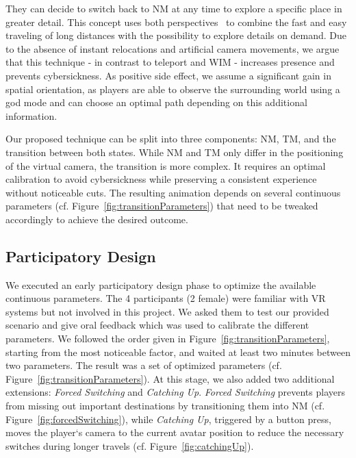 \documentclass[sigchi-a, authorversion]{acmart}
\newcommand{\comm}[1]{}
\begin{document}
They can decide to switch back to NM at any time to explore a specific place in greater detail. \comm{The resulting transition between NM and TM is a short transformation between both camera position.} This concept uses both perspectives~\cite{gorisse2017first} to combine the fast and easy traveling of long distances with the possibility to explore details on demand. Due to the absence of instant relocations and artificial camera movements, we argue that this technique - in contrast to teleport and WIM - increases presence and prevents cybersickness. As positive side effect, we assume a significant gain in spatial orientation, as players are able to observe the surrounding world using a god mode and can choose an optimal path depending on this additional information.\par
Our proposed technique can be split into three components: NM, TM, and the transition between both states. While NM and TM only differ in the positioning of the virtual camera, the transition is more complex. It requires an optimal calibration to avoid cybersickness while preserving a consistent experience without noticeable cuts. The resulting animation depends on several continuous parameters (cf. Figure~\ref{fig:transitionParameters}) that need to be tweaked accordingly to achieve the desired outcome. 

\subsection{Participatory Design}
We executed an early participatory design phase to optimize the available continuous parameters. The 4 participants (2 female) were familiar with VR systems but not involved in this project. We asked them to test our provided scenario and give oral feedback which was used to calibrate the different parameters. We followed the order given in Figure~\ref{fig:transitionParameters}, starting from the most noticeable factor, and waited at least two minutes between two parameters. The result was a set of optimized parameters (cf. Figure~\ref{fig:transitionParameters}). At this stage, we also added two additional extensions: \textit{Forced Switching} and \textit{Catching Up}. \textit{Forced Switching} prevents players from missing out important destinations by transitioning them into NM (cf. Figure~\ref{fig:forcedSwitching}), while \textit{Catching Up}, triggered by a button press, moves the player`s camera to the current avatar position to reduce the necessary switches during longer travels (cf. Figure~\ref{fig:catchingUp}).
\end{document}
